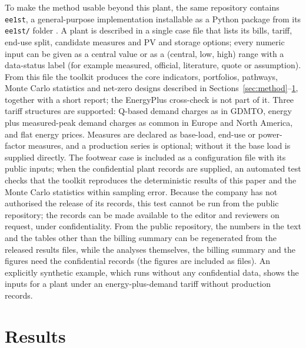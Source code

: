 \documentclass[preprint,12pt,authoryear]{elsarticle}
\begin{document}
To make the method usable beyond this plant, the same repository contains \texttt{ee1st}, a general-purpose implementation installable as a Python package from its \texttt{ee1st/} folder \citep{ee1st2026}. A plant is described in a single case file that lists its bills, tariff, end-use split, candidate measures and PV and storage options; every numeric input can be given as a central value or as a (central, low, high) range with a data-status label (for example measured, official, literature, quote or assumption). From this file the toolkit produces the core indicators, portfolios, pathways, Monte Carlo statistics and net-zero designs described in Sections~\ref{sec:method}--\ref{sec:results}, together with a short report; the EnergyPlus cross-check is not part of it. Three tariff structures are supported: Q-based demand charges as in GDMTO, energy plus measured-peak demand charges as common in Europe and North America, and flat energy prices. Measures are declared as base-load, end-use or power-factor measures, and a production series is optional; without it the base load is supplied directly. The footwear case is included as a configuration file with its public inputs; when the confidential plant records are supplied, an automated test checks that the toolkit reproduces the deterministic results of this paper and the Monte Carlo statistics within sampling error. Because the company has not authorised the release of its records, this test cannot be run from the public repository; the records can be made available to the editor and reviewers on request, under confidentiality. From the public repository, the numbers in the text and the tables other than the billing summary can be regenerated from the released results files, while the analyses themselves, the billing summary and the figures need the confidential records (the figures are included as files). An explicitly synthetic example, which runs without any confidential data, shows the inputs for a plant under an energy-plus-demand tariff without production records.

\section{Results}
\label{sec:results}
\end{document}

